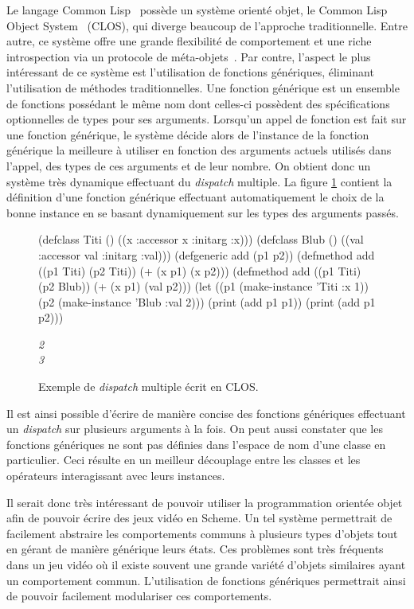 \documentclass[12pt,oneside,letterpaper,francais]{book}
\begin{document}
Le langage Common Lisp~\cite{CLISP} possède un système orienté objet,
le Common Lisp Object System~\cite{CLOS} (CLOS), qui diverge beaucoup
de l'approche traditionnelle. Entre autre, ce système offre une grande
flexibilité de comportement et une riche introspection via un
protocole de méta-objets~\cite{MOP}. Par contre, l'aspect le plus
intéressant de ce système est l'utilisation de fonctions génériques,
éliminant l'utilisation de méthodes traditionnelles. Une fonction
générique est un ensemble de fonctions possédant le même nom dont
celles-ci possèdent des spécifications optionnelles de types pour ses
arguments. Lorsqu'un appel de fonction est fait sur une fonction
générique, le système décide alors de l'instance de la fonction
générique la meilleure à utiliser en fonction des arguments actuels
utilisés dans l'appel, des types de ces arguments et de leur
nombre. On obtient donc un système très dynamique effectuant du
\textit{dispatch} multiple. La figure \ref{OO:CLOS_ex} contient la
définition d'une fonction générique effectuant automatiquement le
choix de la bonne instance en se basant dynamiquement sur les types
des arguments passés.

\begin{figure}[htb!]
  \begin{schemecode}
(defclass Titi () ((x :accessor x :initarg :x)))
(defclass Blub () ((val :accessor val :initarg :val)))
(defgeneric add (p1 p2))
(defmethod add ((p1 Titi) (p2 Titi)) (+ (x p1) (x p2)))
(defmethod add ((p1 Titi) (p2 Blub)) (+ (x p1) (val p2)))
(let ((p1 (make-instance 'Titi :x 1))
            (p2 (make-instance 'Blub :val 2)))
        (print (add p1 p1))
        (print (add p1 p2)))
  \end{schemecode}
  {{\it
2\\
3}}
  \caption{Exemple de \textit{dispatch} multiple écrit en CLOS.}
  \label{OO:CLOS_ex}
\end{figure}

Il est ainsi possible d'écrire de manière concise des fonctions
génériques effectuant un \textit{dispatch} sur plusieurs arguments à
la fois. On peut aussi constater que les fonctions génériques ne sont
pas définies dans l'espace de nom d'une classe en particulier. Ceci
résulte en un meilleur découplage entre les classes et les opérateurs
interagissant avec leurs instances.

Il serait donc très intéressant de pouvoir utiliser la programmation
orientée objet afin de pouvoir écrire des jeux vidéo en Scheme. Un tel
système permettrait de facilement abstraire les comportements communs
à plusieurs types d'objets tout en gérant de manière générique leurs
états. Ces problèmes sont très fréquents dans un jeu vidéo où il
existe souvent une grande variété d'objets similaires ayant un
comportement commun. L'utilisation de fonctions génériques permettrait
ainsi de pouvoir facilement modulariser ces comportements.
\end{document}

